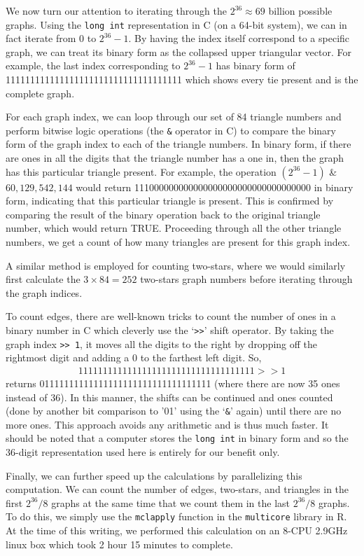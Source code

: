 We now turn our attention to iterating through the $2^{36} \approx 69$ billion possible graphs.  
Using the \texttt{long int} representation in C (on a 64-bit system), 
we can in fact iterate from 0 to $2^{36}-1$.  By having the index itself 
correspond to a specific graph,  we can treat its binary form as 
the collapsed upper triangular vector.
For example, the last index corresponding to $2^{36}-1$ has binary form of 
 111111111111111111111111111111111111 which shows every tie present and
 is the complete graph.
   
For each graph index, we can loop through our set of 84 triangle numbers
and perform bitwise logic operations (the \texttt{\&} operator in C) to 
compare the binary form of the graph index to each of the triangle numbers.  
In binary form, if there are ones in all the digits that the triangle number has a 
one in, 
then the graph has this particular triangle present.
For example, the operation $(2^{36}-1)$ \& $60,129,542,144$ would return 
111000000000000000000000000000000000 in binary form, indicating that this 
particular triangle is present.  This is confirmed by comparing the
result of the binary operation back to the original triangle number,
which would return TRUE.  Proceeding through all the other triangle numbers, 
we get a count of how many triangles are present for this graph index.

A similar method is employed for counting two-stars, where we would similarly
first calculate the $3\times84 = 252$ two-stars graph numbers before iterating
through the graph indices.

To count edges, there are well-known tricks to count the number of ones 
in a binary number in C which cleverly use the `\texttt{>>}' shift operator.
By taking the graph index \texttt{>> 1}, it moves all the digits to the 
right by dropping off the rightmost digit and adding a 0 to the 
farthest left digit.  So, 
\begin{align*}
111111111111111111111111111111111111 >> 1
\end{align*}
returns 01111111111111111111111111111111111 (where there are now 35 ones instead of 36).  
In this manner, the shifts can be continued and ones counted 
(done by another bit comparison to '01' using the `\texttt{\&}' again) 
until there are no more ones.  This approach avoids any arithmetic and is thus much faster.  
It should be noted that a computer stores the \texttt{long int} in binary form 
and so the 36-digit representation used here is entirely for our benefit only.

Finally, we can further speed up the calculations by parallelizing this computation.  
We can count the number of edges, two-stars, and triangles in the 
first $2^{36}/8$ graphs at the same time that we count them in the last $2^{36}/8$ graphs.  
To do this, we simply use the \texttt{mclapply} function in the \texttt{multicore} \citep{multicore:R} 
library in R.
At the time of this writing, we performed this calculation on an 8-CPU 2.9GHz linux box
which took 2 hour 15 minutes to complete.  




